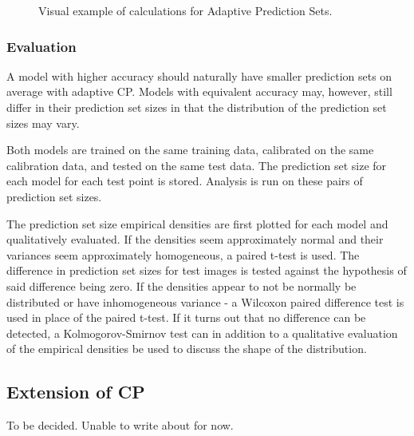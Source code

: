 \begin{figure}
    \caption{Visual example of calculations for Adaptive Prediction Sets.}
\end{figure}


\subsubsection{Evaluation}
A model with higher accuracy should naturally have smaller prediction sets on average with adaptive CP. Models with equivalent accuracy may, however, still differ in their prediction set sizes in that the distribution of the prediction set sizes may vary. 

Both models are trained on the same training data, calibrated on the same calibration data, and tested on the same test data. The prediction set size for each model for each test point is stored. Analysis is run on these pairs of prediction set sizes.

The prediction set size empirical densities are first plotted for each model and qualitatively evaluated. If the densities seem approximately normal and their variances seem approximately homogeneous, a paired t-test is used. The difference in prediction set sizes for test images is tested against the hypothesis of said difference being zero. If the densities appear to not be normally be distributed or have inhomogeneous variance - a Wilcoxon paired difference test is used in place of the paired t-test. If it turns out that no difference can be detected, a Kolmogorov-Smirnov test can in addition to a qualitative evaluation of the empirical densities be used to discuss the shape of the distribution.


\subsection{Extension of CP}
To be decided. Unable to write about for now.